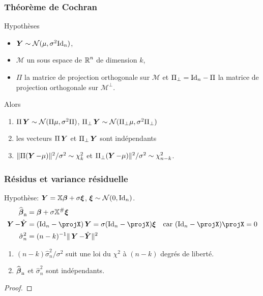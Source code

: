 \begin{frame}
\frametitle{Théorème de Cochran}
\begin{theo}
\alert{Hypothèses}
\begin{itemize}
\item $\operatorname{\boldsymbol{Y}} \sim \mathcal{N}(\mu,\sigma^2 \mathrm{Id}_{n})$, 
\item $\mathcal{M}$ un sous espace de $\operatorname{{\mathbb R}}^n$ de dimension $k$, 
\item $\Pi$ la matrice de projection orthogonale
sur $\mathcal{M}$ et $\Pi_{\perp}= \mathrm{Id}_{n} - \Pi$ la matrice de projection orthogonale sur $\mathcal{M}^\perp$.
\end{itemize} 
Alors
\begin{enumerate}
\item \alert<1>{$\Pi \operatorname{\boldsymbol{Y}} \sim \mathcal{N}(\Pi \mu, \sigma^2 \Pi)$, $\Pi_\perp \operatorname{\boldsymbol{Y}} \sim \mathcal{N}(\Pi_{\perp} \mu, \sigma^2 \Pi_{\perp})$}
\item \alert<2>{les vecteurs $\Pi \operatorname{\boldsymbol{Y}}$ et $\Pi_\perp \operatorname{\boldsymbol{Y}}$ sont indépendants}
\item \alert<3>{$\| \Pi(\operatorname{\boldsymbol{Y}} - \mu) \|^2 / \sigma^2 \sim \chi^2_k$ et $\Pi_\perp(\operatorname{\boldsymbol{Y}}-\mu) \|^2/\sigma^2 \sim \chi^2_{n-k}$}.
\end{enumerate}
\end{theo}
\end{frame}

\begin{frame}
\frametitle{Résidus et variance résiduelle}
\alert{Hypothèse:} $\operatorname{\boldsymbol{Y}}= \mathbb{X} \boldsymbol{\beta} +  \sigma \boldsymbol{\xi}$, $\boldsymbol{\xi} \sim \mathcal{N}(0,\mathrm{Id}_{n})$.
\begin{align*}
\estregress    &=  \truebeta + \sigma \regressmat^{\#} \bnoise \\
\bY - \predY   &=  (\Id{n}-\projX) \bY = \sigma (\Id{n} - \projX) \bnoise \quad \text{car $(\Id{n} - \projX) \projX= 0$} \\
\hat{\sigma}_n^2 &= (n-k)^{-1} \| \bY - \predY \|^2
\end{align*}
\begin{theorem}
\begin{enumerate}
\item $(n-k) \hat{\sigma}_n^2/\sigma^2$ suit une loi du $\chi^2$ à $(n-k)$ degrés de liberté.
\item $\operatorname{\widehat{\boldsymbol{\beta}}_n}$ et $\hat{\sigma}_n^2$ sont indépendants.
\end{enumerate}
\end{theorem}
\begin{proof}
\end{proof}
\end{frame}

